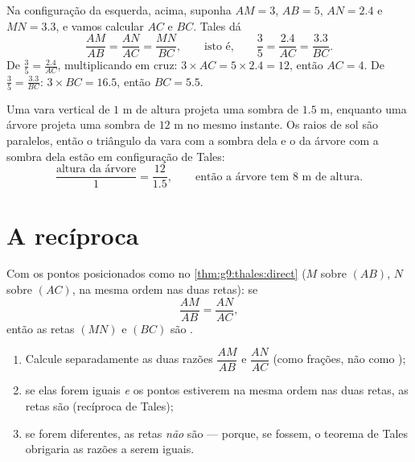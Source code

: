 \begin{example}\label{ex:g9:thales:compute}
Na configuração da esquerda, acima, suponha $AM = 3$, $AB = 5$,
$AN = 2.4$ e $MN = 3.3$, e vamos calcular $AC$ e $BC$. Tales dá
\[
\frac{AM}{AB} = \frac{AN}{AC} = \frac{MN}{BC},
\qquad\text{isto é,}\qquad
\frac35 = \frac{2.4}{AC} = \frac{3.3}{BC}.
\]
De $\frac35 = \frac{2.4}{AC}$, multiplicando em cruz:
$3 \times AC = 5 \times 2.4 = 12$, então $AC = 4$. De
$\frac35 = \frac{3.3}{BC}$: $3 \times BC = 16.5$, então $BC = 5.5$.
\end{example}

\begin{example}\label{ex:g9:thales:stick}
Uma vara vertical de $1$ m de altura projeta uma sombra de $1.5$ m,
enquanto uma árvore projeta uma sombra de $12$ m no mesmo instante. Os
raios de sol são paralelos, então o triângulo da vara com a sombra dela
e o da árvore com a sombra dela estão em configuração de Tales:
\[
\frac{\text{altura da árvore}}{1} = \frac{12}{1.5},
\qquad\text{então a árvore tem } 8 \text{ m de altura.}
\]
\end{example}

\section{A recíproca}

\begin{theorem}\label{thm:g9:thales:converse}
Com os pontos posicionados como no \cref{thm:g9:thales:direct} ($M$
sobre $(AB)$, $N$ sobre $(AC)$, na mesma ordem nas duas retas): se
\[
\frac{AM}{AB} = \frac{AN}{AC},
\]
então as retas $(MN)$ e $(BC)$ são .
\end{theorem}
\admitted

\begin{method}\label{met:g9:thales:converse}
\begin{enumerate}
  \item Calcule separadamente as duas razões $\dfrac{AM}{AB}$ e
        $\dfrac{AN}{AC}$ (como frações, não como );
  \item se elas forem iguais \emph{e} os pontos estiverem na mesma ordem
        nas duas retas, as retas são  (recíproca de Tales);
  \item se forem diferentes, as retas \emph{não} são  ---
        porque, se fossem, o teorema de Tales obrigaria as razões a
        serem iguais.
\end{enumerate}
\end{method}

